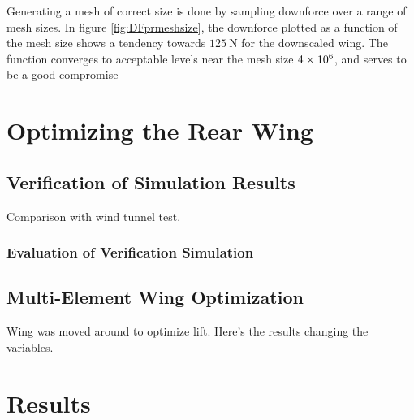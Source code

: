   Generating a mesh of correct size is done by sampling downforce over a range of mesh sizes. In figure \ref{fig:DFprmeshsize}, the downforce plotted as a function of the mesh size shows a tendency towards $\SI{125}{\newton}$ for the downscaled wing. The function converges to acceptable levels near the mesh size $\SI{4E6}{}$, and serves to be a good compromise

\section{Optimizing the Rear Wing}


  \subsection{Verification of Simulation Results}
  \label{sec:simulationcomparison}

  Comparison with wind tunnel test.

  \subsubsection{Evaluation of Verification Simulation}

  \subsection{Multi-Element Wing Optimization}
  Wing was moved around to optimize lift. Here's the results changing the variables.

\section{Results}
